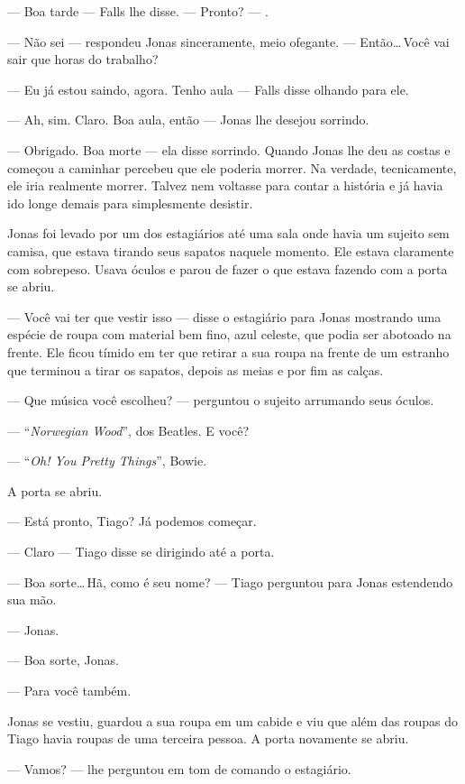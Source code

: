 --- Boa tarde --- Falls lhe disse. --- Pronto? --- .

--- Não sei --- respondeu Jonas sinceramente, meio ofegante. --- Então\ldots\,Você vai sair que horas do trabalho?

--- Eu já estou saindo, agora. Tenho aula --- Falls disse\mudanca{,} olhando para ele.

--- Ah, sim. Claro. Boa aula, então --- Jonas lhe desejou\mudanca{,} sorrindo.

--- Obrigado. Boa morte --- ela disse\mudanca{,} sorrindo. Quando Jonas lhe deu as costas e começou a caminhar percebeu que ele poderia morrer. Na verdade, tecnicamente, ele iria realmente morrer. Talvez nem voltasse para contar a história e já havia ido longe demais para simplesmente desistir.

Jonas foi levado por um dos estagiários até uma sala onde havia um sujeito sem camisa, que estava tirando seus sapatos naquele momento. Ele estava claramente com sobrepeso. Usava óculos e parou de fazer o que estava fazendo com a porta se abriu.

--- Você vai ter que vestir isso --- disse o estagiário para Jonas\mudanca{,} mostrando uma espécie de roupa com material bem fino, azul celeste, que podia ser abotoado na frente. Ele ficou tímido em ter que retirar a sua roupa na frente de um estranho que terminou a tirar os sapatos, depois as meias e por fim as calças.

--- Que música você escolheu? --- perguntou o sujeito arrumando seus óculos.

--- ``\emph{Norwegian Wood}'', dos Beatles. E você?

--- ``\emph{Oh! You Pretty Things}'', Bowie.

A porta se abriu.

--- Está pronto, Tiago? Já podemos começar.

--- Claro --- Tiago disse\mudanca{,} se dirigindo até a porta.

--- Boa sorte\ldots\,Hã, como é seu nome? --- Tiago perguntou para Jonas estendendo sua mão.

--- Jonas.

--- Boa sorte, Jonas.

--- Para você também.

Jonas se vestiu, guardou a sua roupa em um cabide e viu que além das roupas do Tiago havia roupas de uma terceira pessoa. A porta novamente se abriu.

--- Vamos? --- lhe perguntou\mudanca{,} em tom de comando\mudanca{,} o estagiário.

